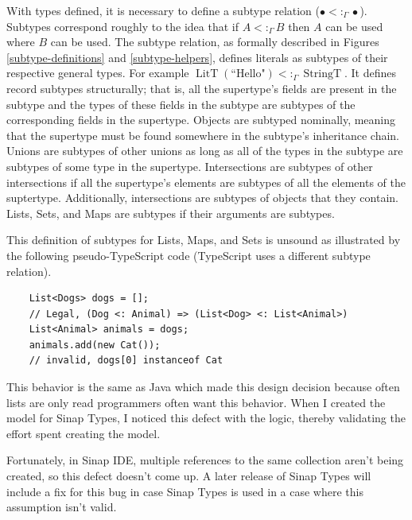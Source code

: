 \documentclass[12pt]{article}
\DeclareMathOperator{\StringT}{StringT}
\DeclareMathOperator{\LitT}{LitT}
\DeclareMathOperator{\textif}{ if }
\newcommand{\subtype}{<:_\Gamma}
\begin{document}
With types defined, it is necessary to define a subtype 
relation (\(\bullet\subtype\bullet\)). Subtypes correspond 
roughly to the idea that if \(A\subtype B\) then \(A\)
can be used where \(B\) can be used. The subtype relation,
as formally described in Figures \ref{subtype-definitions} and \ref{subtype-helpers}, 
defines literals as subtypes of their respective general types.
For example \(\LitT(\text{``Hello"})\subtype\StringT\). It defines
record subtypes structurally; that is, all the supertype's fields 
are present in the subtype and the types of these fields in the subtype
are subtypes of the corresponding fields in the supertype. 
Objects are subtyped nominally, meaning that the supertype must be
found somewhere in the subtype's inheritance chain. Unions are
subtypes of other unions as long as all of the types in the 
subtype are subtypes of some type in the supertype. Intersections are 
subtypes of other intersections if all the supertype's elements are 
subtypes of all the elements of the suptertype. Additionally, 
intersections are subtypes of objects that they contain. Lists, 
Sets, and Maps are subtypes if their arguments are subtypes. 

This definition of subtypes for Lists, Maps, and Sets is unsound
as illustrated by the following pseudo-TypeScript code 
(TypeScript uses a different subtype relation).

\begin{verbatim}
    List<Dogs> dogs = [];
    // Legal, (Dog <: Animal) => (List<Dog> <: List<Animal>)
    List<Animal> animals = dogs; 
    animals.add(new Cat()); 
    // invalid, dogs[0] instanceof Cat
\end{verbatim}

This behavior is the same as Java which made this design decision 
because often lists are only read programmers often want
this behavior. When I created the model for Sinap Types,
I noticed this defect with the logic, thereby validating 
the effort spent creating the model. 

Fortunately, in Sinap IDE, multiple references to 
the same collection aren't being created,
so this defect doesn't come up. A later release 
of Sinap Types will include a fix for this bug in 
case Sinap Types is used in a case where this assumption isn't
valid.

\newcommand{\stfif}{\\&\textif}
\end{document}
